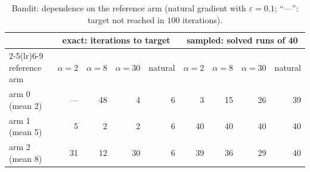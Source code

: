 \documentclass[11pt,a4paper]{article}
\numberwithin{equation}{section}
\theoremstyle{plain}
\theoremstyle{definition}
\theoremstyle{remark}
\begin{document}
\begin{table}[!htbp]
\centering
\small
\begin{tabular}{@{}lrrrrrrrr@{}}
\toprule
 & \multicolumn{4}{c}{exact: iterations to target} & \multicolumn{4}{c}{sampled: solved runs of 40}\\
\cmidrule(lr){2-5}\cmidrule(lr){6-9}
reference arm & $\alpha=2$ & $\alpha=8$ & $\alpha=30$ & natural & $\alpha=2$ & $\alpha=8$ & $\alpha=30$ & natural\\
\midrule
arm 0 (mean 2) & --- & 48 & 4 & 6 & 3 & 15 & 26 & 39\\
arm 1 (mean 5) & 5 & 2 & 2 & 6 & 40 & 40 & 40 & 40\\
arm 2 (mean 8) & 31 & 12 & 30 & 6 & 39 & 36 & 29 & 40\\
\bottomrule
\end{tabular}
\caption{Bandit: dependence on the reference arm (natural gradient with $\varepsilon=0.1$; ``---'': target not reached in $100$ iterations).}\label{tab:bandit-refarm}
\end{table}
\end{document}
